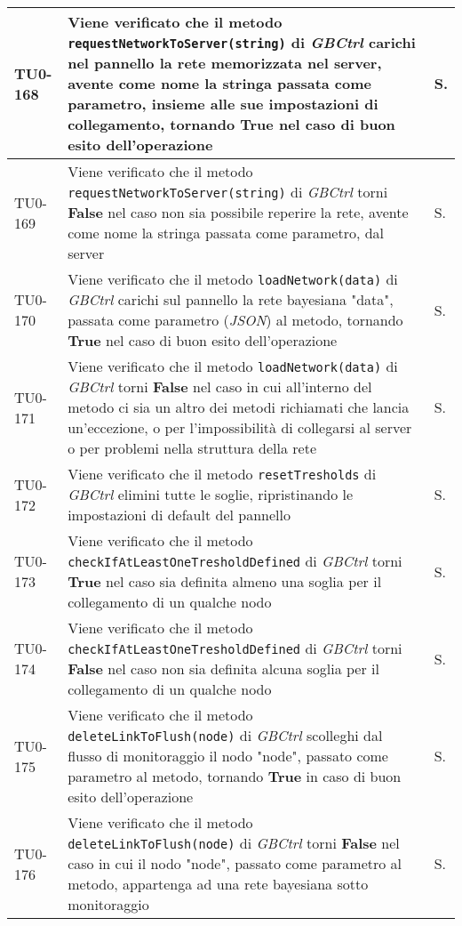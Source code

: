 \begin{longtable}{|C{.15\textwidth}|m{.66\textwidth}|C{.10\textwidth}|}
\hline
TU0-168 & Viene verificato che il metodo \texttt{requestNetworkToServer(string)} di \textit{GBCtrl} carichi nel pannello la rete memorizzata nel server, avente come nome la stringa passata come parametro, insieme alle sue impostazioni di collegamento, tornando \textbf{True} nel caso di buon esito dell'operazione & S.\\
\hline
{}TU0-169 & Viene verificato che il metodo \texttt{requestNetworkToServer(string)} di \textit{GBCtrl} torni \textbf{False} nel caso non sia possibile reperire la rete, avente come nome la stringa passata come parametro, dal server & S.\\
\hline
TU0-170 & Viene verificato che il metodo \texttt{loadNetwork(data)} di \textit{GBCtrl} carichi sul pannello la rete bayesiana "data", passata come parametro (\textit{JSON}) al metodo, tornando \textbf{True} nel caso di buon esito dell'operazione & S.\\
\hline
{}TU0-171 & Viene verificato che il metodo \texttt{loadNetwork(data)} di \textit{GBCtrl} torni \textbf{False} nel caso in cui all'interno del metodo ci sia un altro dei metodi richiamati che lancia un'eccezione, o per l'impossibilità di collegarsi al server o per problemi nella struttura della rete  & S.\\
\hline
TU0-172 & Viene verificato che il metodo \texttt{resetTresholds} di \textit{GBCtrl} elimini tutte le soglie, ripristinando le impostazioni di default del pannello & S.\\
\hline
{}TU0-173 & Viene verificato che il metodo \texttt{checkIfAtLeastOneTresholdDefined} di \textit{GBCtrl} torni \textbf{True} nel caso sia definita almeno una soglia per il collegamento di un qualche nodo & S.\\
\hline
TU0-174 & Viene verificato che il metodo \texttt{checkIfAtLeastOneTresholdDefined} di \textit{GBCtrl} torni \textbf{False} nel caso non sia definita alcuna soglia per il collegamento di un qualche nodo & S.\\
\hline
{}TU0-175 & Viene verificato che il metodo \texttt{deleteLinkToFlush(node)} di \textit{GBCtrl} scolleghi dal flusso di monitoraggio il nodo "node", passato come parametro al metodo, tornando \textbf{True} in caso di buon esito dell'operazione & S.\\
\hline
TU0-176 & Viene verificato che il metodo \texttt{deleteLinkToFlush(node)} di \textit{GBCtrl} torni \textbf{False} nel caso in cui il nodo "node", passato come parametro al metodo, appartenga ad una rete bayesiana sotto monitoraggio & S.\\

\end{longtable}
